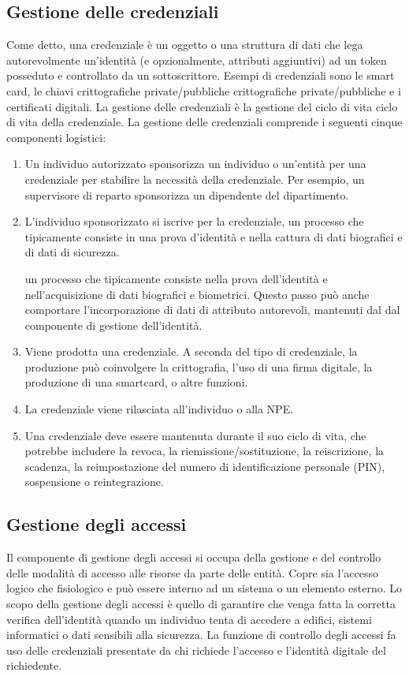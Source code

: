 \subsection{Gestione delle credenziali}
Come detto, una credenziale è un oggetto o una struttura di dati che lega autorevolmente un'identità (e opzionalmente, attributi aggiuntivi) ad un token posseduto e controllato da un sottoscrittore. Esempi di credenziali sono le smart card, le chiavi crittografiche private/pubbliche crittografiche private/pubbliche e i certificati digitali. La gestione delle credenziali è la gestione del ciclo di vita ciclo di vita della credenziale.
\singlespacing
La gestione delle credenziali comprende i seguenti cinque componenti logistici:
\begin{enumerate}
    \item Un individuo autorizzato sponsorizza un individuo o un'entità per una credenziale per stabilire la necessità della credenziale. Per esempio, un supervisore di reparto sponsorizza un dipendente del dipartimento.

    \item L'individuo sponsorizzato si iscrive per la credenziale, un processo che tipicamente consiste in una prova d'identità e nella cattura di dati biografici e di dati di sicurezza.

un processo che tipicamente consiste nella prova dell'identità e nell'acquisizione di dati biografici e biometrici. Questo passo può anche comportare l'incorporazione di dati di attributo autorevoli, mantenuti dal dal componente di gestione dell'identità.

    \item Viene prodotta una credenziale. A seconda del tipo di credenziale, la produzione può coinvolgere la crittografia, l'uso di una firma digitale, la produzione di una smartcard, o altre funzioni.

    \item La credenziale viene rilasciata all'individuo o alla NPE.
    
    \item Una credenziale deve essere mantenuta durante il suo ciclo di vita, che potrebbe includere la revoca, la riemissione/sostituzione, la reiscrizione, la scadenza, la reimpostazione del numero di identificazione personale (PIN), sospensione o reintegrazione.
\end{enumerate}
\newpage
\subsection{Gestione degli accessi}
Il componente di gestione degli accessi si occupa della gestione e del controllo delle modalità di accesso alle risorse da parte delle entità. Copre sia l'accesso logico che fisiologico e può essere interno ad un sistema o un elemento esterno. Lo scopo della gestione degli accessi è quello di garantire che venga fatta la corretta verifica dell'identità quando un individuo tenta di accedere a edifici, sistemi informatici o dati sensibili alla sicurezza. La funzione di controllo degli accessi fa uso delle credenziali presentate da chi richiede l'accesso e l'identità digitale del richiedente.

